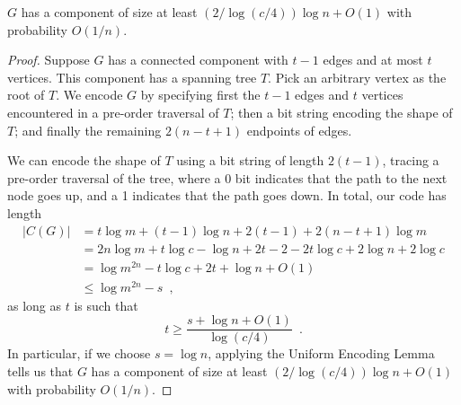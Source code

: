 \documentclass{patmorin}
\begin{document}
\begin{lem}
  $G$ has a component of size at least $(2/\log(c/4))\log n + O(1)$
  with probability $O(1/n)$.
\end{lem}
\begin{proof}
  Suppose $G$ has a connected component with $t - 1$ edges and at most
  $t$ vertices. This component has a spanning tree $T$. Pick an
  arbitrary vertex as the root of $T$. We encode $G$ by specifying
  first the $t - 1$ edges and $t$ vertices encountered in a pre-order
  traversal of $T$; then a bit string encoding the shape of $T$; and
  finally the remaining $2(n - t + 1)$ endpoints of edges.

  We can encode the shape of $T$ using a bit string of length
  $2(t - 1)$, tracing a pre-order traversal of the tree, where a 0 bit
  indicates that the path to the next node goes up, and a 1 indicates
  that the path goes down. In total, our code has length
  \begin{align*}
    |C(G)| &= t \log m + (t - 1) \log n + 2(t - 1) + 2 (n - t + 1) \log m \\
           &= 2n\log m + t \log c - \log n + 2t - 2 - 2t \log c + 2\log n + 2 \log c \tag{since $m = cn$}\\
           &= \log m^{2n} - t \log c + 2t + \log n + O(1) \\
           &\le \log m^{2n} - s \enspace ,
  \end{align*}
  as long as $t$ is such that
  \[
    t \geq \frac{s + \log n + O(1)}{\log (c/4)} \enspace .
  \]
  In particular, if we choose $s = \log n$, applying the Uniform
  Encoding Lemma tells us that $G$ has a component of size at least
  $(2/\log (c/4))\log n + O(1)$ with probability $O(1/n)$.
\end{proof}
\end{document}
